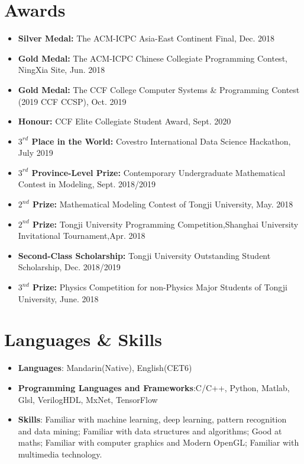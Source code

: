 \documentclass[letterpaper,11pt]{article}
\newcommand{\resumeItem}[2]{
  \item\small{
    \textbf{#1}{ #2 \vspace{-2pt}}
  }
}
\newcommand{\resumeSubItem}[2]{\resumeItem{#1}{#2}\vspace{-4pt}}
\newcommand{\resumeSubHeadingListStart}{\begin{itemize}[leftmargin=*]}
\newcommand{\resumeSubHeadingListEnd}{\end{itemize}}
\begin{document}
\begin{spacing}{0.985}
 \section{Awards}
 \resumeSubHeadingListStart
 \resumeSubItem{}{
    \textbf{Silver Medal: }{The ACM-ICPC Asia-East Continent Final, Dec. 2018}
    }
    
    \resumeSubItem{}{
    \textbf{Gold Medal: }{The ACM-ICPC Chinese Collegiate Programming Contest, NingXia Site, Jun. 2018}
    }
    \resumeSubItem{}{
    \textbf{Gold Medal: }{The CCF College Computer Systems \& Programming Contest (2019 CCF CCSP), Oct. 2019}
    }
    \resumeSubItem{}{
    \textbf{Honour: }{CCF Elite Collegiate Student Award, Sept. 2020}
    }
    \resumeSubItem{}{
    \textbf{$3^{rd}$ Place in the World: }{Covestro International Data Science Hackathon, July 2019}
    }
    \resumeSubItem{}{
    \textbf{$3^{rd}$ Province-Level Prize: }{Contemporary Undergraduate Mathematical Contest in Modeling, Sept. 2018/2019}
    }
    \resumeSubItem{}{
    \textbf{$2^{nd}$ Prize: }{Mathematical Modeling Contest of Tongji University, May. 2018}
    }
    \resumeSubItem{}{
    \textbf{$2^{nd}$ Prize: }{Tongji University Programming Competition,Shanghai University Invitational Tournament,Apr. 2018}
    }
    \resumeSubItem{}{
    \textbf{Second-Class Scholarship: }{Tongji University Outstanding Student Scholarship, Dec. 2018/2019}
    }
    
    \resumeSubItem{}{
    \textbf{$3^{nd}$ Prize: }{Physics Competition for non-Physics Major Students of Tongji University, June. 2018}
    }
 \resumeSubHeadingListEnd
\section{Languages \& Skills}
 \resumeSubHeadingListStart
 \resumeSubItem{}{
     \textbf{Languages}{: Mandarin(Native), English(CET6)}
     }
 \resumeSubItem{}{
     \textbf{Programming Languages and Frameworks}{:C/C++, Python, Matlab, Glsl, VerilogHDL, MxNet, TensorFlow }
    }
 \resumeSubItem{}{
     \textbf{Skills}{: Familiar with machine learning, deep learning, pattern recognition and data mining; Familiar with data structures and algorithms; Good at maths; Familiar with computer graphics and Modern OpenGL; Familiar with multimedia technology.}
    }
\clearpage
 \resumeSubHeadingListEnd
\end{spacing}
\end{document}
